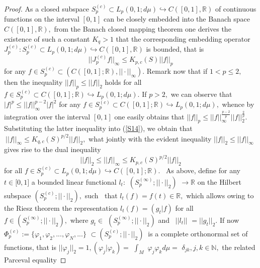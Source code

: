 \documentclass[pdflatex,sn-mathphys-num]{sn-jnl}%
\theoremstyle{thmstyleone}%
\theoremstyle{thmstyletwo}%
\theoremstyle{thmstylethree}%
\begin{document}
\begin{proof}
	As a closed subspace $S_{p}^{(c)}\subset L_{p}(0,1;d\mu )\hookrightarrow
	C([0,1],\mathbb{R})$ of continuous functions on the interval $[0,1]$ can be
	closely embedded into the Banach space $C([0,1],\mathbb{R}),$
	from the Banach closed mapping theorem \cite{Lax,Rudi} one derives the
	existence of such a constant $K_{q}>1$ that the corresponding embedding
	operator $J_{p}^{(c)}:S_{p}^{(c)}\subset L_{p}(0,1;d\mu )\hookrightarrow
	C([0,1],\mathbb{R})$ is bounded, that is 
	\begin{equation}
		||J_{p}^{(c)}f||_{\infty }\leq K_{p,c}(S)||f||_{p}  \label{S14}
	\end{equation}%
	for any $f\in S_{p}^{(c)}\subset (C([0,1];\mathbb{R}),||\cdot ||_{\infty }).$
	Remark now that if $1<p\leq 2,$ then the inequality $||f||_{p}\leq ||f||_{2}$
	holds for all $f\in S_{p}^{(c)}\subset C([0,1];\mathbb{R})\hookrightarrow
	L_{p}(0,1;d\mu ).$ If $p>2,$ we can observe that $|f|^{p}\leq ||f||_{\infty
	}^{p-2}|f|^{2}$ for any $f\in S_{p}^{(c)}\subset C([0,1];\mathbb{R}%
	)\hookrightarrow L_{p}(0,1;d\mu ),$ whence by integration over the interval $%
	[0,1]$ one easily obtains that $||f||_{p}\leq ||f||_{\infty }^{\frac{p-2}{p}%
	}||f||_{2}^{\frac{2}{p}}.$ Substituting the latter inequality into  
	(\ref{S14}),  we obtain that $\ ||f||_{\infty }\leq
	K_{q,c}(S)^{p/2}||f||_{2},$ what jointly with the evident inequality $%
	||f||_{2}\leq ||f||_{\infty }$ gives rise to the dual inequality 
	\begin{equation}
		||f||_{2}\leq ||f||_{\infty }\leq K_{p,c}(S)^{p/2}||f||_{2}  \label{S15}
	\end{equation}%
	for all $f\in S_{p}^{(c)}\subset L_{p}(0,1;d\mu )\hookrightarrow C([0,1];%
	\mathbb{R}).$ \ As above, define for any $t\in \lbrack 0,1]$ a bounded
	linear functional $l_{t}:$ $(S_{p}^{(\infty )};||\cdot ||_{2})$ $\rightarrow 
	\mathbb{R}$ on the Hilbert subspace $(S_{p}^{(c)};||\cdot ||_{2}),$ such $\ $
	that $l_{t}(f)=f(t)\in \mathbb{R},$ which allows owing to the Riesz theorem
	the representation $l_{t}(f)=(g_{t}|f)$ for all $f\in (S_{p}^{(\infty
		)};||\cdot ||_{2}),$ where $g_{t}\in $ $(S_{p}^{(\infty )};||\cdot ||_{2})$
	and \ $||l_{t}||$ $=||g_{t}||_{2}.$ If now $\Phi _{p}^{(c)}:=\{\varphi
	_{1},\varphi _{2},...,\varphi _{N},...\}$ $\subset (S_{p}^{(c)};||\cdot
	||_{2})\ $ is a complete orthonormal set of functions, that is $||\varphi
	_{j}||_{2}=1,(\varphi _{j}|\varphi _{k})=$ $\int_{M}$ $\varphi _{j}\varphi
	_{k}d\mu =$ $\delta _{jk},j,k\in \mathbb{N},$ the related Parceval equality 

\end{proof}
\end{document}
